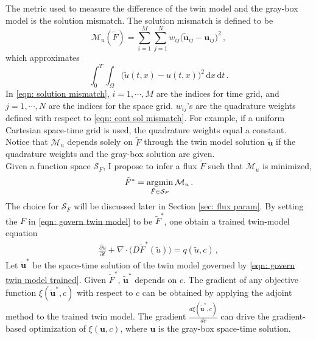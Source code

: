 The metric used to measure the difference of the twin model and the gray-box model is the
solution mismatch.
The solution mismatch is defined to be
\begin{equation}
    \mathcal{M}_u(\tilde{F}) = \sum_{i=1}^M \sum_{j=1}^N w_{ij} \big( \tilde{\boldsymbol{u}}_{ij}
     -\boldsymbol{u}_{ij}\big)^2 \,,
    \label{eqn: solution mismatch}
\end{equation}
which approximates
\begin{equation}
    \int_{0}^T\int_\Omega \big(\tilde{u}(t,x) - u(t,x)\big)^2 \, \textrm{d}x\,\textrm{d}t\,.
    \label{eqn: cont sol mismatch}
\end{equation}
In \eqref{eqn: solution mismatch}, $i=1,\cdots, M$ are the indices for time grid, and $j=1,\cdots, N$ are the indices for the space grid.
$w_{ij}$'s are the quadrature weights defined with respect to \eqref{eqn: cont sol mismatch}. 
For example, if a uniform Cartesian space-time grid is used, the quadrature weights equal a constant.
Notice that $\mathcal{M}_u$ depends solely on
$\tilde{F}$ through the twin model solution $\tilde{\boldsymbol{u}}$ if the 
quadrature weights and the gray-box solution are given.\\


Given a function space $\mathcal{S}_F$,
I propose to infer a flux $\tilde{F}$ such that $\mathcal{M}_u$ is minimized,
\begin{equation}
    \tilde{F}^* = \operatorname*{\arg\!\min}_{\tilde{F} \in \mathcal{S}_F} \mathcal{M}_u\,.
    \label{eqn: twin min mismatch}
\end{equation}
The choice for $\mathcal{S}_F$ will be discussed later in Section \ref{sec: flux param}. 
By setting the $F$ in \eqref{eqn: govern twin model} to be $\tilde{F}^*$,
one obtain a trained twin-model equation
\begin{equation}\begin{split}
    \frac{\partial \tilde{u}}{\partial t}+ \nabla \cdot \big(D \tilde{F}^*(\tilde{u})\big) = q(\tilde{u},c)\,,
\end{split}
\label{eqn: govern twin model trained}
\end{equation}
Let $\tilde{\boldsymbol{u}}^*$ be the space-time solution of the twin model governed by \eqref{eqn: govern twin model trained}.
Given $\tilde{F}^*$, $\tilde{\boldsymbol{u}}^*$ depends on $c$. 
The gradient of any objective function $\xi(\tilde{\boldsymbol{u}}^*, c)$ with respect to $c$
can be obtained by applying the adjoint method to the trained twin model.
The gradient $\frac{d \xi(\tilde{\boldsymbol{u}}^*, c)}{dc}$ can drive the 
gradient-based optimization of 
$\xi({\boldsymbol{u}}, c)$, where ${\boldsymbol{u}}$ is the gray-box space-time solution.\\

